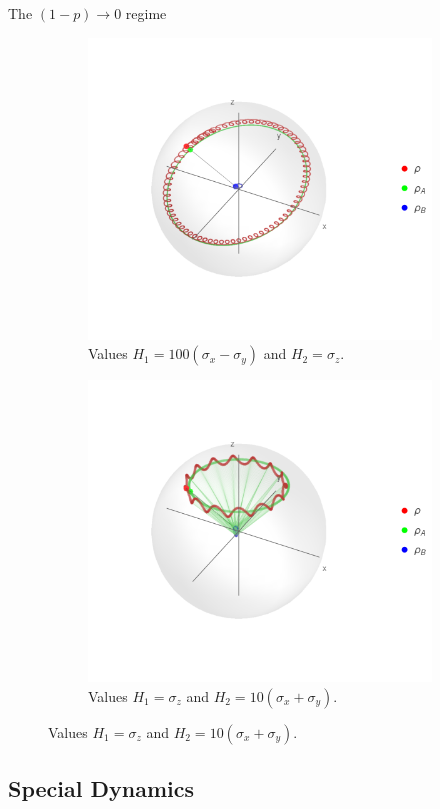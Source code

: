 \begin{frame}{The $(1-p)\rightarrow 0$ regime}
    \begin{figure}[h!]
        \centering
        \begin{subfigure}{0.5\textwidth}
            \centering
            \includegraphics[width=0.6\linewidth]{../notes/log/maxent/figures/U1xU2_H1=100(sx-sy)_H2=sz_z=0.9_p=0.85_sequence.png}
            \caption{Values $H_{1}=100(\sigma_{x}-\sigma_{y})$ and $H_{2}=\sigma_{z}$.}
        \end{subfigure}%
        \begin{subfigure}{0.5\textwidth}
            \centering
            \includegraphics[width=0.6\linewidth]{../notes/log/maxent/figures/U1xU2_H1=sz_H2=10*(sx+sy)_z=0.9_p=0.85_sequence.png}
            \caption{Values $H_{1}=\sigma_{z}$ and $H_{2}=10(\sigma_{x}+\sigma_{y})$.}
        \end{subfigure}
    \end{figure}
\end{frame}


\subsection{Special Dynamics}

